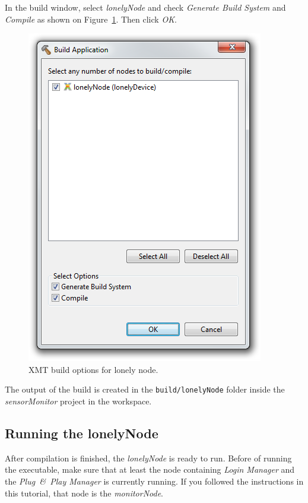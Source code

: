 In the build window, select \emph{lonelyNode} and check \emph{Generate Build System} and \emph{Compile}
as shown on Figure~\ref{fig:xmt_deploymentLonely_buildWindow}.
Then click \emph{OK}.

\begin{figure}[ht]
	\centering
	\includegraphics[scale=0.75]{figures/xmt_deploymentLonely_buildWindow.png}
	\caption{XMT build options for lonely node.}
	\label{fig:xmt_deploymentLonely_buildWindow}
\end{figure}

The output of the build is created in the \verb|build/lonelyNode| folder inside the \emph{sensorMonitor} project in the workspace.

\subsection{Running the lonelyNode}

After compilation is finished, the \emph{lonelyNode} is ready to run.
Before of running the executable, make sure that at least the node containing \emph{Login Manager} and the \emph{Plug~\&~Play Manager} is currently running.
If you followed the instructions in this tutorial, that node is the \emph{monitorNode}.

